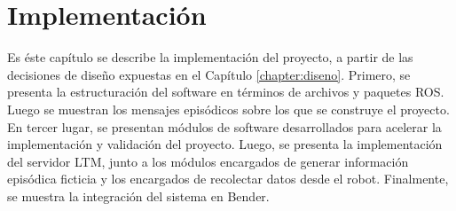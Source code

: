 \chapter{Implementación}\label{chapter:implementacion}






Es éste capítulo se describe la implementación del proyecto, a partir de las decisiones de diseño expuestas en el Capítulo \ref{chapter:diseno}. Primero, se presenta la estructuración del software en términos de archivos y paquetes ROS. Luego se muestran los mensajes episódicos sobre los que se construye el proyecto. En tercer lugar, se presentan módulos de software desarrollados para acelerar la implementación y validación del proyecto. Luego, se presenta la implementación del servidor LTM, junto a los módulos encargados de generar información episódica ficticia y los encargados de recolectar datos desde el robot. Finalmente, se muestra la integración del sistema en Bender.

